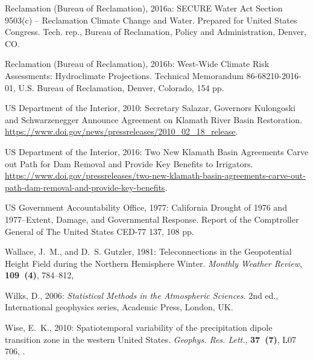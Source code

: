 \documentclass[final, double]{ua-thesis}
\begin{document}
\begin{thebibliography}{}
{Reclamation (Bureau of Reclamation)}, 2016a: {SECURE} {Water} {Act} {Section} 9503(c)
  – {Reclamation} {Climate} {Change} and {Water}. {Prepared} for {United}
  {States} {Congress}. Tech. rep., Bureau of Reclamation, Policy and
  Administration, Denver, CO.

{Reclamation (Bureau of Reclamation)}, 2016b: West-{Wide} {Climate} {Risk} {Assessments}:
  {Hydroclimate} {Projections}. Technical {Memorandum} 86-68210-2016-01, U.S.
  Bureau of Reclamation, Denver, Colorado, 154 pp.

{US Department of the Interior}, 2010: Secretary {Salazar}, {Governors}
  {Kulongoski} and {Schwarzenegger} {Announce} {Agreement} on {Klamath} {River}
  {Basin} {Restoration}.
  \urlprefix\url{https://www.doi.gov/news/pressreleases/2010_02_18_release}.

{US Department of the Interior}, 2016: Two {N}ew {K}lamath {B}asin {A}greements {Carve} out {Path} for {Dam} {Removal} and {Provide} {Key} {Benefits} to {Irrigators}.
  \urlprefix\url{https://www.doi.gov/pressreleases/two-new-klamath-basin-agreements-carve-out-path-dam-removal-and-provide-key-benefits}.

{US Government Accountability Office}, 1977: California {Drought} of 1976 and
  1977--{Extent}, {Damage}, and {Governmental} {Response}. Report of the
  {Comptroller} {General} of {The} {United} {States} CED-77 137, 108 pp.

Wallace, J.~M., and D.~S. Gutzler, 1981: Teleconnections in the {Geopotential}
  {Height} {Field} during the {Northern} {Hemisphere} {Winter}. \textit{Monthly
  Weather Review}, \textbf{109~(4)}, 784--812,

Wilks, D., 2006: \textit{Statistical {Methods} in the {Atmospheric}
  {Sciences}}. 2nd ed., International geophysics series, Academic Press,
  London, UK.

Wise, E.~K., 2010: Spatiotemporal variability of the precipitation dipole
  transition zone in the western {United} {States}. \textit{Geophys. Res.
  Lett.}, \textbf{37~(7)}, L07\,706, .


\end{thebibliography}
\end{document}
